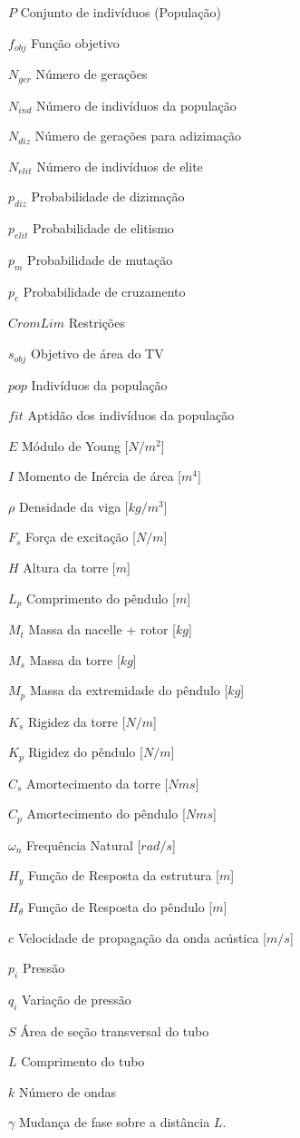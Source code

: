 \begin{simbolos}
	\item[$P$]		Conjunto de indivíduos (População) 			
	\item[$f_{obj}$] 	Função objetivo
	\item[$N_{ger}$] 	Número de gerações
	\item[$N_{ind}$] 	Número de indivíduos da população
	\item[$N_{diz}$] 	Número de gerações para adizimação
	\item[$N_{elit}$]   Número de indivíduos de elite
	\item[$p_{diz}$] 	Probabilidade de dizimação
	\item[$p_{elit}$] 	Probabilidade de elitismo
	\item[$p_m$] 		Probabilidade de mutação
	\item[$p_c$]		Probabilidade de cruzamento
	\item[$CromLim$] 	Restrições
	\item[$s_{obj}$] 		Objetivo de área do TV
	\item[$pop$]		Indivíduos da população
	\item[$fit$] 		Aptidão dos indivíduos da população
	\item[$E$] 			Módulo de Young					 	[$N/m^2$]	
	\item[$I$] 			Momento de Inércia de área			[$m^4$]	
	\item[$\rho$] 		Densidade da viga 					[$kg/m^3$]	
	\item[$F_s$] 		Força de excitação					[$N/m$]	
	\item[$H$]			Altura da torre						[$m$]
	\item[$L_p$] 		Comprimento do pêndulo 			 	[$m$]
	\item[$M_t$]		Massa da nacelle + rotor			[$kg$]
	\item[$M_s$] 		Massa da torre 					 	[$kg$]
	\item[$M_p$] 		Massa da extremidade do pêndulo  	[$kg$]
	\item[$K_s$] 		Rigidez da torre				 	[$N/m$]
	\item[$K_p$] 		Rigidez do pêndulo 				 	[$N/m$]
	\item[$C_s$] 		Amortecimento da torre 			 	[$Nms$]
	\item[$C_p$] 		Amortecimento do pêndulo 		 	[$Nms$]
	\item[$\omega_n$] 	Frequência Natural			 		[$rad/s$]
	\item[$H_y$] 	 	Função de Resposta da estrutura 	[$m$]
	\item[$H_\theta$] 	Função de Resposta do pêndulo		[$m$]
	\item[$c$] 	Velocidade de propagação da onda acústica [$m/s$]
	\item[$p_i$] 	Pressão
	\item[$q_i$] 	Variação de pressão
	\item[$S$]		Área de seção transversal do tubo
	\item[$L$]		Comprimento do tubo
	\item[$k$] 		Número de ondas
	\item[$\gamma$] Mudança de fase sobre a distância $L$.
\end{simbolos}
